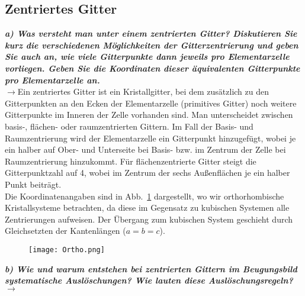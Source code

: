 \subsection{\label{subsec:FZV6}Zentriertes Gitter}
\textbf{\textit{a) Was versteht man unter einem zentrierten Gitter? 
Diskutieren Sie kurz die verschiedenen Möglichkeiten der Gitterzentrierung 
und geben Sie auch an, wie viele Gitterpunkte dann jeweils pro Elementarzelle 
vorliegen. Geben Sie die Koordinaten dieser äquivalenten Gitterpunkte 
pro Elementarzelle an.}}\\
$\rightarrow$Ein zentriertes Gitter ist ein Kristallgitter, bei dem zusätzlich zu den Gitterpunkten an den Ecken 
der Elementarzelle (primitives Gitter) noch weitere Gitterpunkte im Inneren der Zelle vorhanden sind. 
Man unterscheidet zwischen basis-, flächen- oder raumzentrierten Gittern. 
Im Fall der Basis- und Raumzentrierung wird der Elementarzelle ein Gitterpunkt hinzugefügt, wobei je ein halber auf 
Ober- und Unterseite bei 
Basis- bzw. im Zentrum der Zelle bei Raumzentrierung hinzukommt.
Für flächenzentrierte Gitter steigt die Gitterpunktzahl auf 4, wobei im Zentrum der sechs Außenflächen je ein halber 
Punkt beiträgt. \\ 
Die Koordinatenangaben sind in Abb.~\ref{fig:orth} dargestellt, wo wir orthorhombische Kristallsysteme betrachten, 
da diese im Gegensatz zu kubischen Systemen alle Zentrierungen aufweisen. Der Übergang zum kubischen System geschieht 
durch Gleichsetzten der Kantenlängen ($a=b=c$).
\begin{figure}[h!]
    \centering
    \texttt{[image: Ortho.png]}
    \caption{\label{fig:orth}}
\end{figure}

\textbf{\textit{b) Wie und warum entstehen bei zentrierten Gittern im Beugungsbild 
systematische Auslöschungen? Wie lauten diese Auslöschungsregeln?}}\\
$\rightarrow$